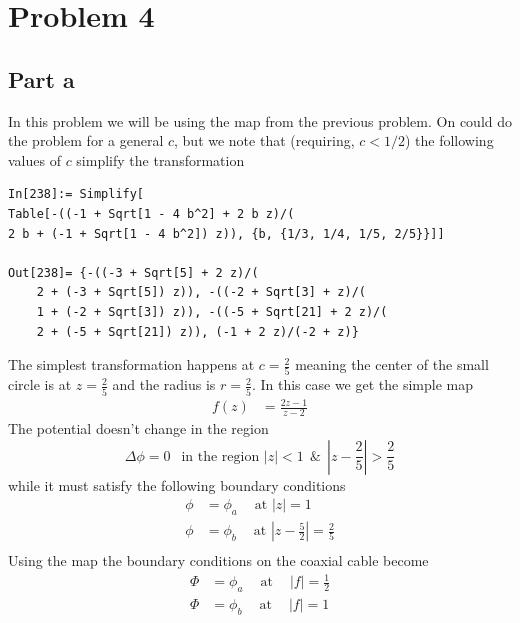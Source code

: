 \documentclass[a4paper,12pt]{article}
\begin{document}
\section*{Problem 4}
\subsection*{Part a}
In this problem we will be using the map from the previous problem. On could do the problem for a general $c$, but we note that (requiring, $c<1/2$) the following values of $c$ simplify the transformation
\begin{lstlisting}
In[238]:= Simplify[
Table[-((-1 + Sqrt[1 - 4 b^2] + 2 b z)/(
2 b + (-1 + Sqrt[1 - 4 b^2]) z)), {b, {1/3, 1/4, 1/5, 2/5}}]]

Out[238]= {-((-3 + Sqrt[5] + 2 z)/(
	2 + (-3 + Sqrt[5]) z)), -((-2 + Sqrt[3] + z)/(
	1 + (-2 + Sqrt[3]) z)), -((-5 + Sqrt[21] + 2 z)/(
	2 + (-5 + Sqrt[21]) z)), (-1 + 2 z)/(-2 + z)}
\end{lstlisting}
The simplest transformation happens at $c=\frac{2}{5}$ meaning the center of the small circle is at $z=\frac{2}{5}$ and the radius is $r=\frac{2}{5}$. In this case we get the simple map
\begin{equation}
	\begin{aligned}
		f(z)
		&=\frac{2z-1}{z-2}
	\end{aligned}
\end{equation}
The potential doesn't change in the region
\begin{equation}
\Delta \phi=0 ~~\text{ in the region }|z| < 1~~\&~~|z-\frac{2}{5}| >\frac{2}{5}
\end{equation}
while it must satisfy the following boundary conditions
\begin{equation}
\begin{aligned}
\phi&=\phi_a~~~~\text{ at } |z|=1\\
\phi&=\phi_b~~~~\text{ at } |z-\frac{5}{2}|=\frac{2}{5}\\
\end{aligned}
\end{equation}
Using the map the boundary conditions on the coaxial cable become
\begin{equation}
	\begin{aligned}
		\Phi&=\phi_a~~~~\text{ at }~~~~ |f|=\frac{1}{2}\\
		\Phi&=\phi_b~~~~\text{ at } ~~~~|f|=1\\
	\end{aligned}
\end{equation}
\end{document}

